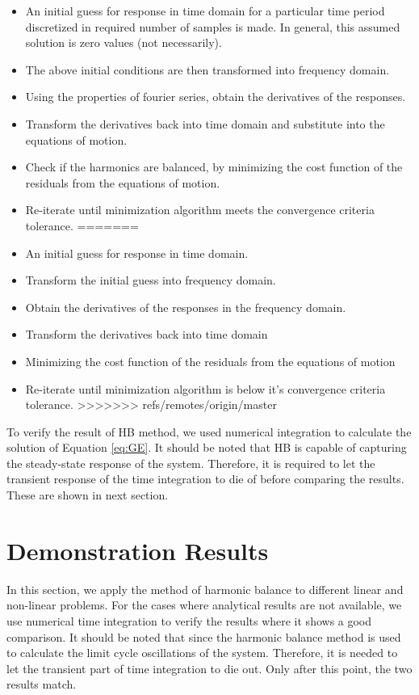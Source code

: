 \documentclass[12pt, a4paper]{extarticle}
\begin{document}
\begin{itemize}

\item An initial guess for response in time domain for a particular time period discretized in required number of samples is made. In general, this assumed solution is zero values (not necessarily).
\item The above initial conditions are then transformed into frequency domain. 
\item Using the properties of fourier series, obtain the derivatives of the responses.
\item Transform the derivatives back into time domain and substitute into the equations of motion.
\item Check if the harmonics are balanced, by minimizing the cost function of the residuals from the equations of motion. 
\item Re-iterate until minimization algorithm meets the convergence criteria tolerance.
=======
\item An initial guess for response in time domain.
\item Transform the initial guess into frequency domain. 
\item Obtain the derivatives of the responses in the frequency domain.
\item Transform the derivatives back into time domain
\item Minimizing the cost function of the residuals from the equations of motion 
\item Re-iterate until minimization algorithm is below it's convergence criteria tolerance.
>>>>>>> refs/remotes/origin/master
\end{itemize}

To verify the result of HB method, we used numerical integration to calculate the solution of Equation \eqref{eq:GE}. It should be noted that HB is capable of capturing the steady-state response of the system. Therefore, it is required to let the transient response of the time integration to die of before comparing the results. These are shown in next section.

\section{Demonstration Results}
In this section, we apply the method of harmonic balance to different linear and non-linear problems. For the cases where analytical results are not available, we use numerical time integration to verify the results where it shows a good comparison. It should be noted that since the harmonic balance method is used to calculate the limit cycle oscillations of the system. Therefore, it is needed to let the transient part of time integration to die out. Only after this point, the two results match.
\end{document}
